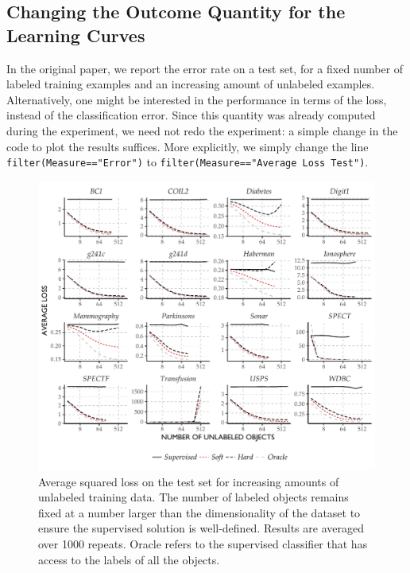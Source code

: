 \documentclass[twoside]{memoir}\usepackage[]{graphicx}\usepackage{xcolor}
\makeatletter
\def\maxwidth{ %
  \ifdim\Gin@nat@width>\linewidth
    \linewidth
  \else
    \Gin@nat@width
  \fi
}
\newenvironment{knitrout}{}{} %
\newcommand{\inlinecode}{\texttt}
\makeatother
\begin{document}
\subsection{Changing the Outcome Quantity for the Learning Curves}
In the original paper, we report the error rate on a test set, for a fixed number of labeled training examples and an increasing amount of unlabeled examples. Alternatively, one might be interested in the performance in terms of the loss, instead of the classification error. Since this quantity was already computed during the experiment, we need not redo the experiment: a simple change in the code to plot the results suffices. More explicitly, we simply change the line \inlinecode{filter(Measure=="Error")} to \inlinecode{filter(Measure=="Average Loss Test")}.

\begin{knitrout}
\color{fgcolor}\begin{figure}
\includegraphics[width=\maxwidth]{figure/learningcurves-loss-1} \caption[Average squared loss on the test set for increasing amounts of unlabeled training data]{Average squared loss on the test set for increasing amounts of unlabeled training data. The number of labeled objects remains fixed at a number larger than the dimensionality of the dataset to ensure the supervised solution is well-defined. Results are averaged over 1000 repeats. Oracle refers to the supervised classifier that has access to the labels of all the objects.}\label{fig:learningcurves-loss}
\end{figure}


\end{knitrout}
\end{document}
